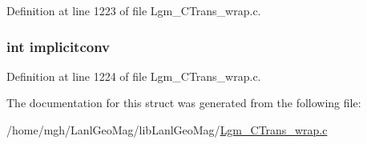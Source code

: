 Definition at line 1223 of file Lgm\_\-CTrans\_\-wrap.c.\hypertarget{struct_py_swig_client_data_efc03bc0f3c3a18125653ab9f5c5486e}{
\subsubsection[{implicitconv}]{\setlength{\rightskip}{0pt plus 5cm}int {\bf implicitconv}}}
\label{struct_py_swig_client_data_efc03bc0f3c3a18125653ab9f5c5486e}




Definition at line 1224 of file Lgm\_\-CTrans\_\-wrap.c.

The documentation for this struct was generated from the following file:\begin{CompactItemize}
\item 
/home/mgh/LanlGeoMag/libLanlGeoMag/\hyperlink{_lgm___c_trans__wrap_8c}{Lgm\_\-CTrans\_\-wrap.c}\end{CompactItemize}
